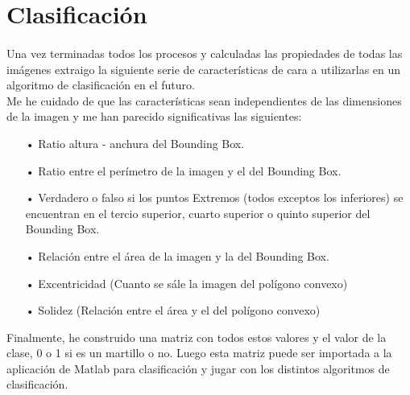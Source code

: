 \documentclass[es,gi]{ifirak}\usepackage[]{graphicx}\usepackage[]{color}
\begin{document}
\section{Clasificación}
\paragraph{}
Una vez terminadas todos los procesos y calculadas las propiedades de todas las imágenes extraigo la siguiente serie de características de cara a utilizarlas en un algoritmo de clasificación en el futuro.\\

Me he cuidado de que las características sean independientes de las dimensiones de la imagen y me han parecido significativas las siguientes:
\begin{itemize}
\item[•] Ratio altura - anchura del Bounding Box.
\item[•] Ratio entre el perímetro de la imagen y el del Bounding Box.
\item[•] Verdadero o falso si los puntos Extremos (todos exceptos los inferiores) se encuentran en el tercio superior, cuarto superior o quinto superior del Bounding Box.
\item[•] Relación entre el área de la imagen y la del Bounding Box.
\item[•] Excentricidad (Cuanto se sále la imagen del polígono convexo)
\item[•] Solidez (Relación entre el área y el del polígono convexo)
\end{itemize}

Finalmente, he construido una matriz con todos estos valores y el valor de la clase, 0 o 1 si es un martillo o no. Luego esta matriz puede ser importada a la aplicación de Matlab para clasificación y jugar con los distintos algoritmos de clasificación.
\end{document}
